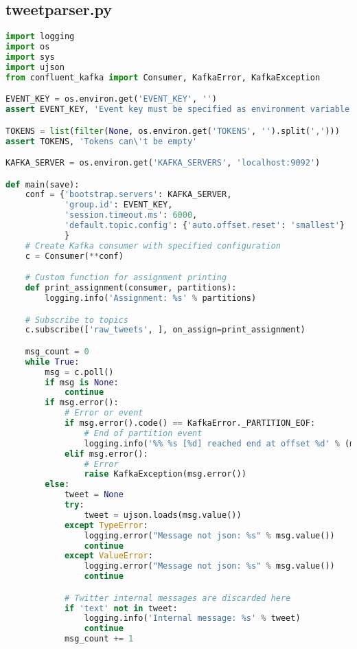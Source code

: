 \newpage


\subsection{tweetparser.py}


\begin{lstlisting}[language=Python]
import logging
import os
import sys
import ujson
from confluent_kafka import Consumer, KafkaError, KafkaException

EVENT_KEY = os.environ.get('EVENT_KEY', '')
assert EVENT_KEY, 'Event key must be specified as environment variable'

TOKENS = list(filter(None, os.environ.get('TOKENS', '').split(',')))
assert TOKENS, 'Tokens can\'t be empty'

KAFKA_SERVER = os.environ.get('KAFKA_SERVERS', 'localhost:9092')

def main(save):
    conf = {'bootstrap.servers': KAFKA_SERVER,
            'group.id': EVENT_KEY,
            'session.timeout.ms': 6000,
            'default.topic.config': {'auto.offset.reset': 'smallest'}
            }
    # Create Kafka consumer with specified configuration
    c = Consumer(**conf)

    # Custom function for assignment printing
    def print_assignment(consumer, partitions):
        logging.info('Assignment: %s' % partitions)

    # Subscribe to topics
    c.subscribe(['raw_tweets', ], on_assign=print_assignment)

    msg_count = 0
    while True:
        msg = c.poll()
        if msg is None:
            continue
        if msg.error():
            # Error or event
            if msg.error().code() == KafkaError._PARTITION_EOF:
                # End of partition event
                logging.info('%% %s [%d] reached end at offset %d' % (msg.topic(), msg.partition(), msg.offset()))
            elif msg.error():
                # Error
                raise KafkaException(msg.error())
        else:
            tweet = None
            try:
                tweet = ujson.loads(msg.value())
            except TypeError:
                logging.error("Message not json: %s" % msg.value())
                continue
            except ValueError:
                logging.error("Message not json: %s" % msg.value())
                continue

            # Twitter internal messages are discarded here
            if 'text' not in tweet:
                logging.info('Internal message: %s' % tweet)
                continue
            msg_count += 1


\end{lstlisting}
